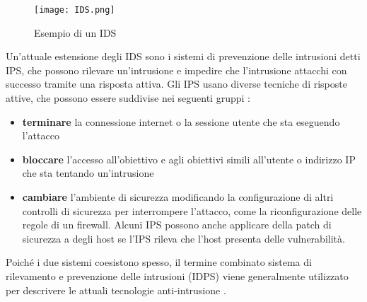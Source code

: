\documentclass[../main.tex]{subfiles}
\begin{document}
\begin{figure}[H]
				\centering
				\texttt{[image: IDS.png]}
				\caption{Esempio di un IDS}
\end{figure}

Un'attuale estensione degli IDS sono i sistemi di prevenzione delle intrusioni detti IPS, che possono rilevare un'intrusione e impedire che l'intrusione attacchi con successo tramite una risposta attiva. Gli IPS usano diverse tecniche di risposte attive, che possono essere suddivise nei seguenti gruppi \cite{IPS}:

\begin{itemize}
				\item \textbf{terminare} la connessione internet o la sessione utente che sta eseguendo l'attacco
				\item \textbf{bloccare} l'accesso all'obiettivo e agli obiettivi simili all'utente o indirizzo IP che sta tentando un'intrusione
				\item \textbf{cambiare} l'ambiente di sicurezza modificando la configurazione di altri controlli di sicurezza per interrompere l'attacco, come la riconfigurazione delle regole di un firewall. Alcuni IPS possono anche applicare della patch di sicurezza a degli host se l'IPS rileva che l'host presenta delle vulnerabilità.
\end{itemize}

Poiché i due sistemi coesistono spesso, il termine combinato sistema di rilevamento e prevenzione delle intrusioni (IDPS) viene generalmente utilizzato per descrivere le attuali tecnologie anti-intrusione \cite{IPS}.
\end{document}
